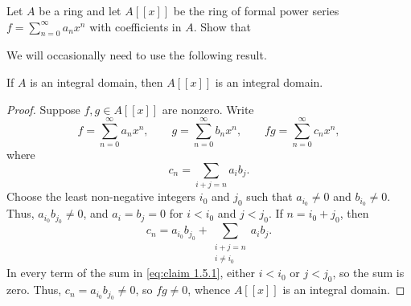 \begin{exercise}
Let \(A\) be a ring and let \(A[[x]]\) be the ring of formal power series \(f = \sum_{n=0}^\infty a_n x^n\) with coefficients in \(A\).
Show that
\end{exercise}

We will occasionally need to use the following result.

\begin{claim}
\label{claim:1.5.1}
If \(A\) is an integral domain, then \(A[[x]]\) is an integral domain.
\end{claim}

\begin{proof}
Suppose \(f,g\in A[[x]]\) are nonzero.
Write
\begin{equation*}
f = \sum_{n=0}^\infty a_n x^n,
\qquad
g = \sum_{n=0}^\infty b_n x^n,
\qquad
f g = \sum_{n=0}^\infty c_n x^n,
\end{equation*}
where
\begin{equation*}
c_n = \sum_{i + j = n} a_i b_j.
\end{equation*}
Choose the least non-negative integers \(i_0\) and \(j_0\) such that \(a_{i_0} \neq 0\) and \(b_{i_0} \neq 0\).
Thus, \(a_{i_0} b_{j_0} \neq 0\), and \(a_i = b_j = 0\) for \(i < i_0\) and \(j < j_0\).
If \(n = i_0 + j_0\), then
\begin{equation}
\label{eq:claim 1.5.1}
c_n = a_{i_0} b_{j_0} + \sum_{\substack{i + j = n \\ i \neq i_0}} a_i b_j.
\end{equation}
In every term of the sum in \eqref{eq:claim 1.5.1}, either \(i < i_0\) or \(j < j_0\), so the sum is zero. Thus, \(c_n = a_{i_0} b_{j_0} \neq 0\), so \(f g \neq 0\), whence \(A[[x]]\) is an integral domain.
\end{proof}

